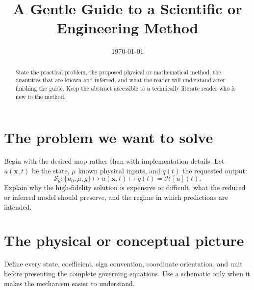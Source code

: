 \documentclass[11pt]{article}
\title{A Gentle Guide to a Scientific or Engineering Method}
\author{}
\date{\today}
\newcommand{\vect}[1]{\bm{#1}}
\begin{document}
\maketitle

\begin{abstract}
State the practical problem, the proposed physical or mathematical method, the quantities that are known and inferred, and what the reader will understand after finishing the guide. Keep the abstract accessible to a technically literate reader who is new to the method.
\end{abstract}

\tableofcontents

\section{The problem we want to solve}

Begin with the desired map rather than with implementation details. Let $u(\vect x,t)$ be the state, $\mu$ known physical inputs, and $q(t)$ the requested output:
\begin{equation}
 \mathcal S_\theta:\{u_0,\mu,g\}\longmapsto u(\vect x,t)
 \longmapsto q(t)=\mathcal H[u](t).
 \label{eq:desired-map}
\end{equation}
Explain why the high-fidelity solution is expensive or difficult, what the reduced or inferred model should preserve, and the regime in which predictions are intended.

\begin{center}
\end{center}

\section{The physical or conceptual picture}

Define every state, coefficient, sign convention, coordinate orientation, and unit before presenting the complete governing equations. Use a schematic only when it makes the mechanism easier to understand.
\end{document}
